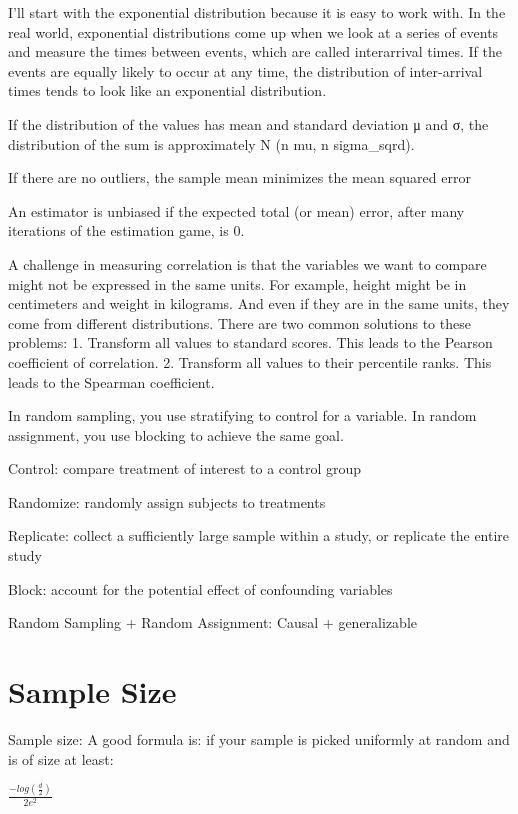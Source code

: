 \documentclass[]{book}
\begin{document}
I'll start with the exponential distribution because it is easy to work with. In the real world, exponential distributions come up when we look at a series of events and measure the times between events, which are called interarrival times. If the events are equally likely to occur at any time, the distribution of inter-arrival times tends to look like an exponential distribution.

If the distribution of the values has mean and standard deviation μ and σ, the distribution of the sum is approximately N (n mu, n sigma\_sqrd).

If there are no outliers, the sample mean minimizes the mean squared error

An estimator is unbiased if the expected total (or mean) error, after many iterations of the estimation game, is 0.

A challenge in measuring correlation is that the variables we want to compare might not be expressed in the same units. For example, height might be in centimeters and weight in kilograms. And even if they are in the same
units, they come from different distributions. There are two common solutions to these problems: 1. Transform all values to standard scores. This leads to the Pearson coefficient of correlation. 2. Transform all values to their percentile ranks. This leads to the Spearman coefficient.

In random sampling, you use stratifying to control for a variable. In random assignment, you use blocking to achieve the same goal.

Control: compare treatment of interest to a control group

Randomize: randomly assign subjects to treatments

Replicate: collect a sufficiently large sample within a study, or replicate the entire study

Block: account for the potential effect of confounding variables

Random Sampling + Random Assignment: Causal + generalizable

\hypertarget{sample-size}{%
\section{Sample Size}\label{sample-size}}

Sample size: A good formula is: if your sample is picked uniformly at random and is of size at least:

\(\frac{-log(\frac{d}{2})}{2e^2}\)
\end{document}
